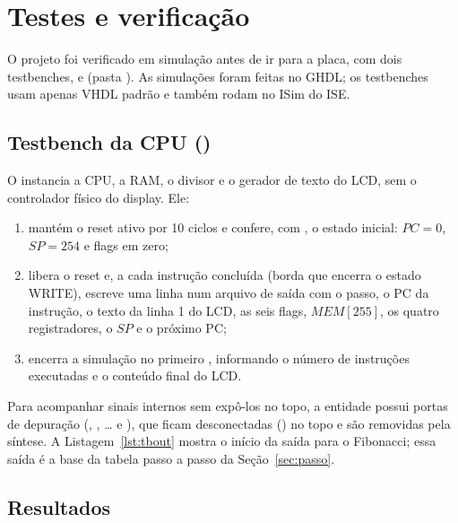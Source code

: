 \section{Testes e verificação}
\label{sec:testes}

O projeto foi verificado em simulação antes de ir para a placa, com dois
testbenches,  e  (pasta ). As simulações
foram feitas no GHDL; os testbenches usam apenas VHDL padrão e também rodam no
ISim do ISE.

\subsection{Testbench da CPU ()}

O  instancia a CPU, a RAM, o divisor e o gerador de texto do LCD,
sem o controlador físico do display. Ele:

\begin{enumerate}[nosep]
  \item mantém o reset ativo por 10 ciclos e confere, com , o
        estado inicial: $PC = 0$, $SP = 254$ e flags em zero;
  \item libera o reset e, a cada instrução concluída (borda que encerra o
        estado WRITE), escreve uma linha num arquivo de saída com o passo, o PC
        da instrução, o texto da linha 1 do LCD, as seis flags, $MEM[255]$, os
        quatro registradores, o $SP$ e o próximo PC;
  \item encerra a simulação no primeiro , informando o número de
        instruções executadas e o conteúdo final do LCD.
\end{enumerate}

Para acompanhar sinais internos sem expô-los no topo, a entidade 
possui portas de depuração (, ,  \ldots
{} e ), que ficam desconectadas () no topo
e são removidas pela síntese. A Listagem~\ref{lst:tbout} mostra o início da
saída para o Fibonacci; essa saída é a base da tabela passo a passo da
Seção~\ref{sec:passo}.



\subsection{Resultados}

